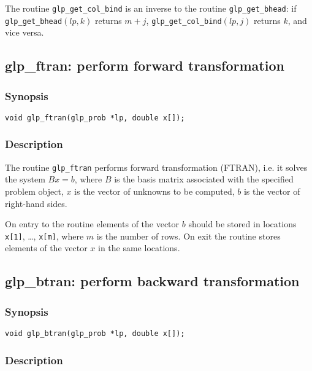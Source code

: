 The routine \verb|glp_get_col_bind| is an inverse to the routine
\verb|glp_get_bhead|: if \verb|glp_get_bhead|$(lp,k)$ returns $m+j$,
\verb|glp_get_col_bind|$(lp,j)$ returns $k$, and vice versa.


\newpage

\subsection{glp\_ftran: perform forward transformation}

\subsubsection*{Synopsis}

\begin{verbatim}
void glp_ftran(glp_prob *lp, double x[]);
\end{verbatim}

\subsubsection*{Description}

The routine \verb|glp_ftran| performs forward transformation (FTRAN),
i.e. it solves the system $Bx=b$, where $B$ is the basis matrix
associated with the specified problem object, $x$ is the vector of
unknowns to be computed, $b$ is the vector of right-hand sides.

On entry to the routine elements of the vector $b$ should be stored in
locations \verb|x[1]|, \dots, \verb|x[m]|, where $m$ is the number of
rows. On exit the routine stores elements of the vector $x$ in the same
locations.

\subsection{glp\_btran: perform backward transformation}

\subsubsection*{Synopsis}

\begin{verbatim}
void glp_btran(glp_prob *lp, double x[]);
\end{verbatim}

\subsubsection*{Description}


